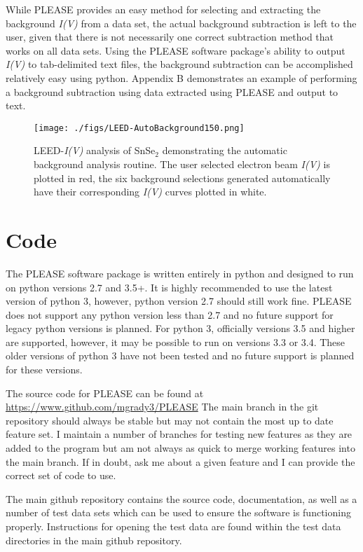 While PLEASE provides an easy method for selecting and extracting the background \textit{I(V)} from a data set, the actual background subtraction is left to the user, given that there is not necessarily one correct subtraction method that works on all data sets. Using the PLEASE software package's ability to output \textit{I(V)} to tab-delimited text files, the background subtraction can be accomplished relatively easy using python. Appendix B demonstrates an example of performing a background subtraction using data extracted using PLEASE and output to text.

\begin{figure}
  \centering
    \texttt{[image: ./figs/LEED-AutoBackground150.png]}
    \caption{
    LEED-\textit{I(V)} analysis of SnSe$_2$ demonstrating the automatic background analysis routine. The user selected electron beam \textit{I(V)} is plotted in red, the six background selections generated automatically have their corresponding \textit{I(V)} curves plotted in white.
    }
    \label{leed-autobackground}
\end{figure}


\section{Code}
The PLEASE software package is written entirely in python and designed to run on python versions 2.7 and 3.5+. It is highly recommended to use the latest version of python 3, however, python version 2.7 should still work fine. PLEASE does not support any python version less than 2.7 and no future support for legacy python versions is planned. For python 3, officially versions 3.5 and higher are supported, however, it may be possible to run on versions 3.3 or 3.4. These older versions of python 3 have not been tested and no future support is planned for these versions.


The source code for PLEASE can be found at \url{https://www.github.com/mgrady3/PLEASE} The main branch in the git repository should always be stable but may not contain the most up to date feature set. I maintain a number of branches for testing new features as they are added to the program but am not always as quick to merge working features into the main branch.
If in doubt, ask me about a given feature and I can provide the correct set of code to use.

The main github repository contains the source code, documentation, as well as a number of test data sets which can be used to ensure the software is functioning properly. Instructions for opening the test data are found within the test data directories in the main github repository.

